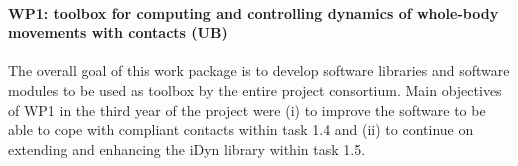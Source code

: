 \paragraph{WP1: toolbox for computing and controlling dynamics of whole-body
  movements with contacts (UB)}

The overall goal of this work package is to develop software libraries and
software modules to be used as toolbox by the entire project consortium.  Main
objectives of WP1 in the third year of the project were (i) to improve the
software to be able to cope with compliant contacts within task 1.4 and (ii)
to continue on extending and enhancing the iDyn library within task 1.5.

